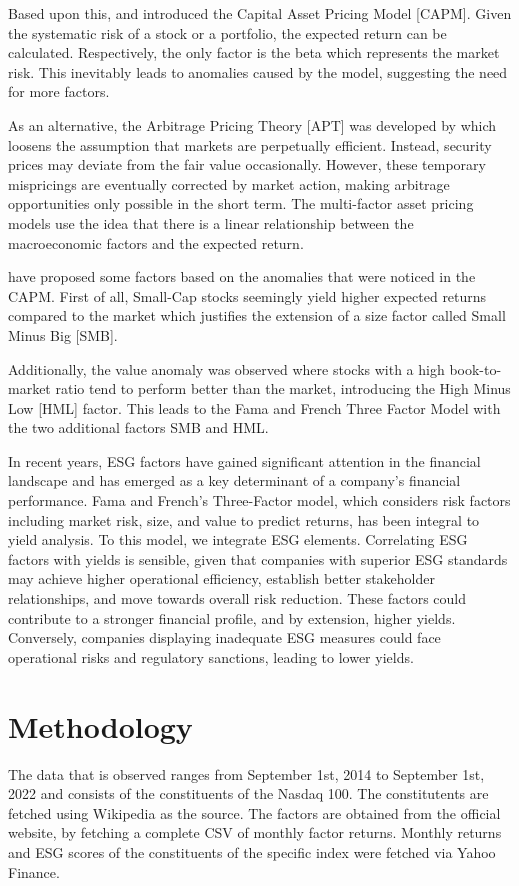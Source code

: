 \documentclass[12pt, a4paper]{article}%
\begin{document}
Based upon this, \textcite{Sharpe1964} and \textcite{Lintner1965} introduced the Capital Asset Pricing Model [CAPM]. Given the systematic risk of a stock or a portfolio, the expected return can be calculated. Respectively, the only factor is the beta which represents the market risk. This inevitably leads to anomalies caused by the model, suggesting the need for more factors.

As an alternative, the Arbitrage Pricing Theory [APT] was developed by \textcite{Ross1976} which loosens the assumption that markets are perpetually efficient. Instead, security prices may deviate from the fair value occasionally. However, these temporary mispricings are eventually corrected by market action, making arbitrage opportunities only possible in the short term.
The multi-factor asset pricing models use the idea that there is a linear relationship between the macroeconomic factors and the expected return.

\textcite{FamaFrench1992} have proposed some factors based on the anomalies that were noticed in the CAPM.
First of all, Small-Cap stocks seemingly yield higher expected returns compared to the market which justifies the extension of a size factor called Small Minus Big [SMB].

Additionally, the value anomaly was observed where stocks with a high book-to-market ratio tend to perform better than the market, introducing the High Minus Low [HML] factor.
This leads to the Fama and French Three Factor Model with the two additional factors SMB and HML.

In recent years, ESG factors have gained significant attention in the financial landscape and has emerged as a key determinant of a company’s financial performance. Fama and French's Three-Factor model, which considers risk factors including market risk, size, and value to predict returns, has been integral to yield analysis. To this model, we integrate ESG elements.
Correlating ESG factors with yields is sensible, given that companies with superior ESG standards may achieve higher operational efficiency, establish better stakeholder relationships, and move towards overall risk reduction. These factors could contribute to a stronger financial profile, and by extension, higher yields. Conversely, companies displaying inadequate ESG measures could face operational risks and regulatory sanctions, leading to lower yields.

\section{Methodology}
The data that is observed ranges from September 1st, 2014 to September 1st, 2022 and consists of the constituents of the Nasdaq 100. The constitutents are fetched using Wikipedia as the source.
The \textcite{FamaFrench1992} factors are obtained from the official website, by fetching a complete CSV of monthly factor returns.
Monthly returns and ESG scores of the constituents of the specific index were fetched via Yahoo Finance.\\
\end{document}

